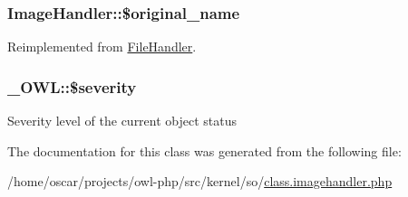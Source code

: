\subsubsection[{\$original\_\-name}]{\setlength{\rightskip}{0pt plus 5cm}ImageHandler::\$original\_\-name}\label{classImageHandler_a1712c9444d65879aab111260767afaab}


Reimplemented from \hyperlink{classFileHandler_a477708585850c3c8725ccf56bfe0b4a8}{FileHandler}.

\subsubsection[{\$severity}]{\setlength{\rightskip}{0pt plus 5cm}\_\-OWL::\$severity}\label{class__OWL_ad26b40a9dbbacb33e299b17826f8327c}
Severity level of the current object status 

The documentation for this class was generated from the following file:\begin{DoxyCompactItemize}
\item 
/home/oscar/projects/owl-\/php/src/kernel/so/\hyperlink{class_8imagehandler_8php}{class.imagehandler.php}\end{DoxyCompactItemize}
